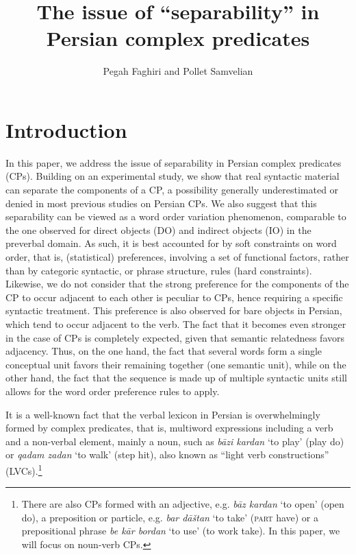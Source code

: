 \documentclass[output=paper]{langsci/langscibook}
\author{Pegah Faghiri\affiliation{Universiteit van Amsterdam}  and Pollet Samvelian\affiliation{Université Sorbonne Nouvelle}}
\title{The issue of “separability” in Persian complex predicates}
\begin{document}
\maketitle

\section{Introduction}

\begin{sloppypar}
  In this paper, we address the issue of separability in Persian
  complex predicates (CPs). Building on an experimental study, we show
  that real syntactic material can separate the components of a CP, a
  possibility generally underestimated or denied in most previous
  studies on Persian CPs. We also suggest that this separability can
  be viewed as a word order variation phenomenon, comparable to the
  one observed for direct objects (DO) and indirect objects (IO) in
  the preverbal domain. As such, it is best accounted for by soft
  constraints on word order, that is, (statistical) preferences,
  involving a set of functional factors, rather than by categoric
  syntactic, or phrase structure, rules (hard constraints). Likewise,
  we do not consider that the strong preference for the components of
  the CP to occur adjacent to each other is peculiar to CPs, hence
  requiring a specific syntactic treatment. This preference is also
  observed for bare objects in Persian, which tend to occur adjacent
  to the verb. The fact that it becomes even stronger in the case of
  CPs is completely expected, given that semantic relatedness favors
  adjacency.  Thus, on the one hand, the fact that several words form
  a single conceptual unit favors their remaining together (one
  semantic unit), while on the other hand, the fact that the sequence
  is made up of multiple syntactic units still allows for the word
  order preference rules to apply.
\end{sloppypar}

It is a well-known fact that the verbal lexicon in Persian is overwhelmingly formed by complex predicates, that is, multiword expressions including a verb and a non-verbal element, mainly a noun, such as \textit{b\=azi kardan} `to play' (play do) or \textit{qadam zadan} `to walk' (step hit), also known as ``light verb constructions'' (LVCs).\footnote{There are also CPs formed with an adjective, e.g. \textit{b\=az kardan} `to open' (open do), a preposition or particle, e.g. \textit{bar d\=a\v{s}tan} `to take' (\textsc{part} have) or a prepositional phrase \textit{be k\=ar bordan} `to use' (to work take). In this paper, we will focus on noun-verb CPs.}
\end{document}
